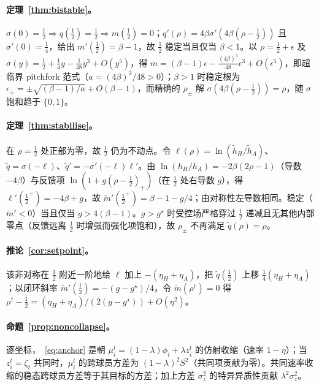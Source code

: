 \documentclass[11pt,UTF8,fontset=fandol]{ctexart}
\theoremstyle{plain}
\theoremstyle{definition}
\theoremstyle{remark}
\begin{document}
\paragraph{定理~\ref{thm:bistable}。} $\sigma(0)=\tfrac12\Rightarrow q(\tfrac12)=\tfrac12\Rightarrow m(\tfrac12)=0$；$q'(\rho)=4\beta\sigma'(4\beta(\rho-\tfrac12))$ 且 $\sigma'(0)=\tfrac14$，给出 $m'(\tfrac12)=\beta-1$，故 $\tfrac12$ 稳定当且仅当 $\beta<1$。以 $\rho=\tfrac12+\epsilon$ 及 $\sigma(y)=\tfrac12+\tfrac14 y-\tfrac1{48}y^3+O(y^5)$，得 $m=(\beta-1)\epsilon-\tfrac{(4\beta)^3}{48}\epsilon^3+O(\epsilon^5)$，即超临界 pitchfork 范式（$a=(4\beta)^3/48>0$）；$\beta>1$ 时稳定根为 $\epsilon_\pm=\pm\sqrt{(\beta-1)/a}+O(\beta-1)$，而精确的 $\rho_\pm$ 解 $\sigma(4\beta(\rho-\tfrac12))=\rho$，随 $\sigma$ 饱和趋于 $\{0,1\}$。

\paragraph{定理~\ref{thm:stabilise}。} 在 $\rho=\tfrac12$ 处正部为零，故 $\tfrac12$ 仍为不动点。令 $\ell(\rho)=\ln(\tilde h_H/\tilde h_A)$、$\tilde q=\sigma(-\ell)$、$\tilde q'=-\sigma'(-\ell)\ell'$。由 $\ln(h_H/h_A)=-2\beta(2\rho-1)$（导数 $-4\beta$）与反馈项 $\ln(1+g(\rho-\tfrac12)_+)$（在 $\tfrac12$ 处右导数 $g$），得 $\ell'(\tfrac12^+)=-4\beta+g$，故 $\tilde m'(\tfrac12^+)=\beta-1-g/4$；由对称性左导数相同。稳定（$\tilde m'<0$）当且仅当 $g>4(\beta-1)$。$g>g^\star$ 时受控场严格穿过 $\tfrac12$ 递减且无其他内部零点（反馈远离 $\tfrac12$ 时增强而强化项饱和），故 $\rho_\pm$ 不再满足 $\tilde q(\rho)=\rho$。

\paragraph{推论~\ref{cor:setpoint}。} 该非对称在 $\tfrac12$ 附近一阶地给 $\ell$ 加上 $-(\eta_H+\eta_A)$，把 $\tilde q(\tfrac12)$ 上移 $\tfrac14(\eta_H+\eta_A)$；以闭环斜率 $\tilde m'(\tfrac12)=-(g-g^\star)/4$，令 $\tilde m(\rho^\dagger)=0$ 得 $\rho^\dagger-\tfrac12=(\eta_H+\eta_A)/(2(g-g^\star))+O(\eta^2)$。

\paragraph{命题~\ref{prop:noncollapse}。} 逐坐标，~\eqref{eq:anchor} 是朝 $\mu_i^t=(1-\lambda)\phi_i+\lambda z_i^t$ 的仿射收缩（速率 $1-\eta$）；当 $z_i^t=\zeta_t$ 共同时，$\mu_i^t$ 的跨球员方差为 $(1-\lambda)^2S^2$（共同项贡献为零）。共同速率收缩的稳态跨球员方差等于其目标的方差；加上方差 $\sigma_z^2$ 的特异异质性贡献 $\lambda^2\sigma_z^2$。
\end{document}
